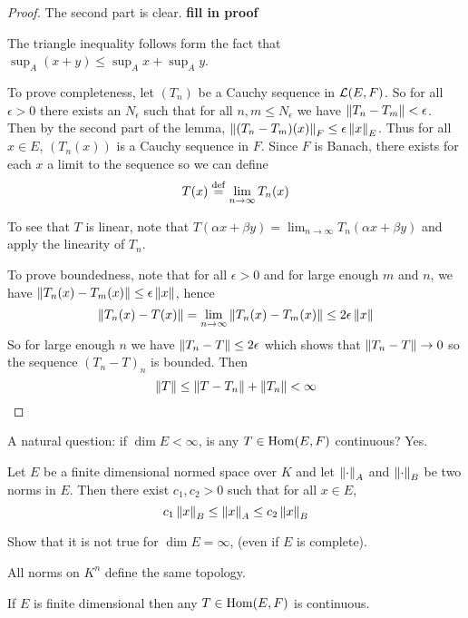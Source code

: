 \begin{proof}
	The second part is clear.
	\textbf{fill in proof}
	
	The triangle inequality follows form the fact that $\sup_A(x+y) \leq \sup_A x + \sup_A y$.
	
	To prove completeness, let $(T_n)$ be a Cauchy sequence in $\mathcal{L}(E,F)$.
	So for all $\epsilon>0$ there exists an $N_\epsilon$ such that for all $n,m \leq N_\epsilon$ we have $\left\lVert T_n-T_m \right\rVert<\epsilon$.
	Then by the second part of the lemma, $\left\lVert (T_n-T_m)(x) \right\rVert_F \leq \epsilon\left\lVert x \right\rVert_E$.
	Thus for all $x \in E$, $(T_n(x))$ is a Cauchy sequence in $F$.
	Since $F$ is Banach, there exists for each $x$ a limit to the sequence so we can define
	\[T(x) \overset{\mathrm{def}}{=} \lim_{n \to \infty} T_n(x)\]
	
	To see that $T$ is linear, note that $T(\alpha x+ \beta y) = \lim_{n \to \infty} T_n(\alpha x + \beta y)$ and apply the linearity of $T_n$.
	
	To prove boundedness, note that for all $\epsilon>0$ and for large enough $m$ and $n$, we have $\left\lVert T_n(x)-T_m(x) \right\rVert \leq \epsilon \left\lVert x \right\rVert$, hence
	\[\left\lVert T_n(x)-T(x) \right\rVert = \lim_{n\to\infty} \left\lVert T_n(x)-T_m(x) \right\rVert \leq 2 \epsilon \left\lVert x \right\rVert\]
	So for large enough $n$ we have $\left\lVert T_n-T \right\rVert \leq 2\epsilon$ which shows that $\left\lVert T_n-T \right\rVert \to 0$ so the sequence $(T_n-T)_n$ is bounded.
	Then
	\[\left\lVert T \right\rVert \leq \left\lVert T-T_n \right\rVert + \left\lVert T_n \right\rVert < \infty \qedhere\]
\end{proof}

A natural question: if $\dim E < \infty$, is any $T \in \operatorname{Hom}(E,F)$ continuous?
Yes.

\begin{prop}\label{prop:equiv-norms}
	Let $E$ be a finite dimensional normed space over $K$ and let $\left\lVert \cdot \right\rVert_A$ and $\left\lVert \cdot \right\rVert_B$ be two norms in $E$.
	Then there exist $c_1,c_2>0$ such that for all $x \in E$,
	\[c_1 \left\lVert x \right\rVert_B \leq \left\lVert x \right\rVert_A \leq c_2 \left\lVert x \right\rVert_B\]
\end{prop}

\begin{exer}
	Show that it is not true for $\dim E = \infty$, (even if $E$ is complete).
\end{exer}

\begin{cor}
	All norms on $K^n$ define the same topology.
\end{cor}

\begin{thm}
	If $E$ is finite dimensional then any $T \in \operatorname{Hom}(E,F)$ is continuous.
\end{thm}

